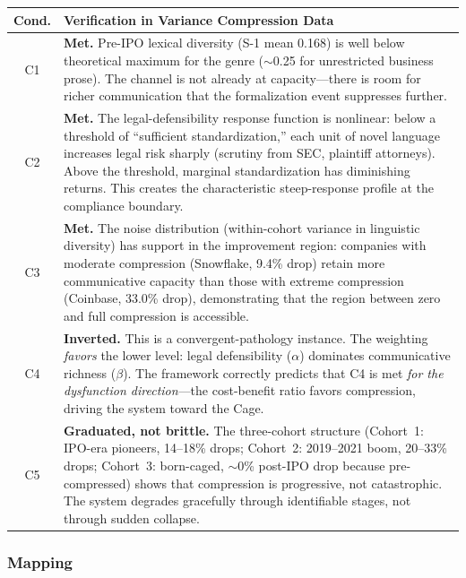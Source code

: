 \documentclass[12pt,letterpaper]{article}
\theoremstyle{definition}
\theoremstyle{remark}
\begin{document}
\begin{center}
\begin{tabular}{@{}cp{10.5cm}@{}}
\toprule
\textbf{Cond.} & \textbf{Verification in Variance Compression Data} \\
\midrule
C1 & \textbf{Met.} Pre-IPO lexical diversity (S-1 mean 0.168) is well below theoretical maximum for the genre ($\sim$0.25 for unrestricted business prose). The channel is not already at capacity---there is room for richer communication that the formalization event suppresses further. \\
C2 & \textbf{Met.} The legal-defensibility response function is nonlinear: below a threshold of ``sufficient standardization,'' each unit of novel language increases legal risk sharply (scrutiny from SEC, plaintiff attorneys). Above the threshold, marginal standardization has diminishing returns. This creates the characteristic steep-response profile at the compliance boundary. \\
C3 & \textbf{Met.} The noise distribution (within-cohort variance in linguistic diversity) has support in the improvement region: companies with moderate compression (Snowflake, 9.4\% drop) retain more communicative capacity than those with extreme compression (Coinbase, 33.0\% drop), demonstrating that the region between zero and full compression is accessible. \\
C4 & \textbf{Inverted.} This is a convergent-pathology instance. The weighting \emph{favors} the lower level: legal defensibility ($\alpha$) dominates communicative richness ($\beta$). The framework correctly predicts that C4 is met \emph{for the dysfunction direction}---the cost-benefit ratio favors compression, driving the system toward the Cage. \\
C5 & \textbf{Graduated, not brittle.} The three-cohort structure (Cohort~1: IPO-era pioneers, 14--18\% drops; Cohort~2: 2019--2021 boom, 20--33\% drops; Cohort~3: born-caged, $\sim$0\% post-IPO drop because pre-compressed) shows that compression is progressive, not catastrophic. The system degrades gracefully through identifiable stages, not through sudden collapse. \\
\bottomrule
\end{tabular}
\end{center}

\subsubsection{Mapping}
\end{document}
